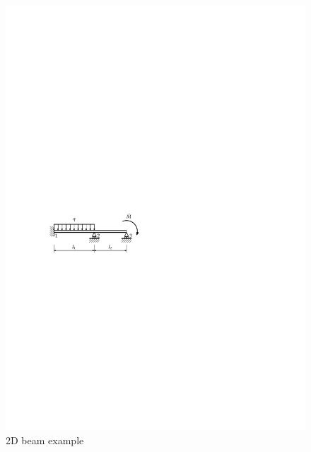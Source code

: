  \begin{figure}[htb]
   \centering
   \includegraphics[scale=1.1]{figures/beam_example}
   \caption{2D beam example}
   \label{fig:structMechMod:exem1_1}
 \end{figure}





